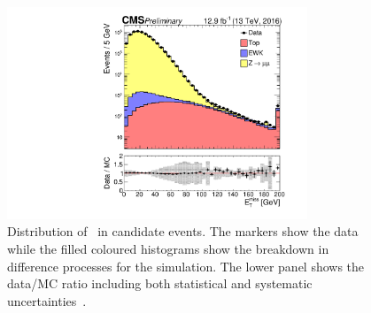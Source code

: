\begin{figure}
\centering
    \includegraphics[width=0.8\textwidth]{./Figures/reconstruction/met_fig.pdf}
  \caption{Distribution of \met~in \zmumu candidate events. The markers show the data while the filled coloured histograms
  show the breakdown in difference processes for the simulation. The lower panel shows the data/MC ratio including
  both statistical and systematic uncertainties~\cite{met_fig}. \label{fig:met_fig} 
}
\end{figure}

